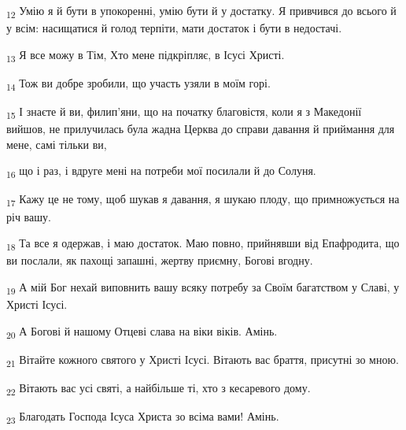 \begin{tcolorbox}
\textsubscript{12} Умію я й бути в упокоренні, умію бути й у достатку. Я привчився до всього й у всім: насищатися й голод терпіти, мати достаток і бути в недостачі.
\end{tcolorbox}
\begin{tcolorbox}
\textsubscript{13} Я все можу в Тім, Хто мене підкріпляє, в Ісусі Христі.
\end{tcolorbox}
\begin{tcolorbox}
\textsubscript{14} Тож ви добре зробили, що участь узяли в моїм горі.
\end{tcolorbox}
\begin{tcolorbox}
\textsubscript{15} І знаєте й ви, филип'яни, що на початку благовістя, коли я з Македонії вийшов, не прилучилась була жадна Церква до справи давання й приймання для мене, самі тільки ви,
\end{tcolorbox}
\begin{tcolorbox}
\textsubscript{16} що і раз, і вдруге мені на потреби мої посилали й до Солуня.
\end{tcolorbox}
\begin{tcolorbox}
\textsubscript{17} Кажу це не тому, щоб шукав я давання, я шукаю плоду, що примножується на річ вашу.
\end{tcolorbox}
\begin{tcolorbox}
\textsubscript{18} Та все я одержав, і маю достаток. Маю повно, прийнявши від Епафродита, що ви послали, як пахощі запашні, жертву приємну, Богові вгодну.
\end{tcolorbox}
\begin{tcolorbox}
\textsubscript{19} А мій Бог нехай виповнить вашу всяку потребу за Своїм багатством у Славі, у Христі Ісусі.
\end{tcolorbox}
\begin{tcolorbox}
\textsubscript{20} А Богові й нашому Отцеві слава на віки віків. Амінь.
\end{tcolorbox}
\begin{tcolorbox}
\textsubscript{21} Вітайте кожного святого у Христі Ісусі. Вітають вас браття, присутні зо мною.
\end{tcolorbox}
\begin{tcolorbox}
\textsubscript{22} Вітають вас усі святі, а найбільше ті, хто з кесаревого дому.
\end{tcolorbox}
\begin{tcolorbox}
\textsubscript{23} Благодать Господа Ісуса Христа зо всіма вами! Амінь.
\end{tcolorbox}
